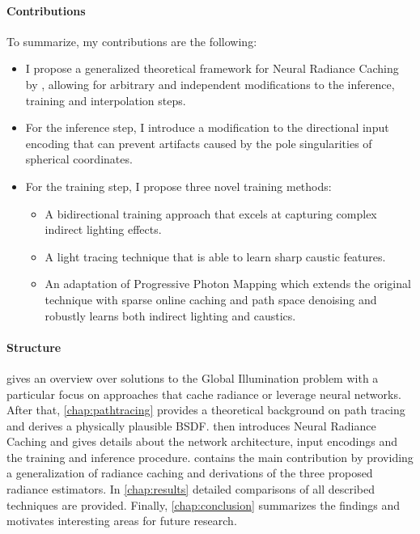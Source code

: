\paragraph{Contributions} To summarize, my contributions are the following:
\begin{itemize}
    \item I propose a generalized theoretical framework for Neural Radiance Caching by \textcite{muller2021}, allowing for arbitrary and independent modifications to the inference, training and interpolation steps.
    \item For the inference step, I introduce a modification to the directional input encoding that can prevent artifacts caused by the pole singularities of spherical coordinates.
    \item For the training step, I propose three novel training methods:
    \begin{itemize}
        \item A bidirectional training approach that excels at capturing complex indirect lighting effects.
        \item A light tracing technique that is able to learn sharp caustic features.
        \item An adaptation of Progressive Photon Mapping \parencite{jensen1996,hachisuka2008} which extends the original technique with sparse online caching and path space denoising and robustly learns both indirect lighting and caustics.
    \end{itemize}
\end{itemize}

\paragraph{Structure}  gives an overview over solutions to the Global Illumination problem with a particular focus on approaches that cache radiance or leverage neural networks.
After that, \cref{chap:pathtracing} provides a theoretical background on path tracing and derives a physically plausible BSDF.
 then introduces Neural Radiance Caching and gives details about the network architecture, input encodings and the training and inference procedure.
 contains the main contribution by providing a generalization of radiance caching and derivations of the three proposed radiance estimators.
In \cref{chap:results} detailed comparisons of all described techniques are provided.
Finally, \cref{chap:conclusion} summarizes the findings and motivates interesting areas for future research.
